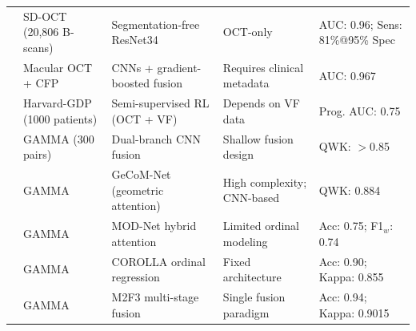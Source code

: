 \documentclass[preprint,12pt]{elsarticle}
\begin{document}
\begin{table}[!t]
{\begin{tabular}{p{} p{} p{} p{} p{}}
            \cite{thompson2020assessment}               &
            SD-OCT (20,806 B-scans)                     &
            Segmentation-free ResNet34                  &
            OCT-only                                    &
            AUC: 0.96; Sens: 81\%@95\% Spec               \\

            \cite{mehta2021automated}                   &
            Macular OCT + CFP                           &
            CNNs + gradient-boosted fusion              &
            Requires clinical metadata                  &
            AUC: 0.967                                    \\

            \cite{luo2023harvard}                       &
            Harvard-GDP (1000 patients)                 &
            Semi-supervised RL (OCT + VF)               &
            Depends on VF data                          &
            Prog. AUC: 0.75                               \\

            \cite{wu2023gamma}                          &
            GAMMA (300 pairs)                           &
            Dual-branch CNN fusion                      &
            Shallow fusion design                       &
            QWK: $>$0.85                                  \\

            \cite{wang2024geometric}                    &
            GAMMA                                       &
            GeCoM-Net (geometric attention)             &
            High complexity; CNN-based                  &
            QWK: 0.884                                    \\

            \cite{wang2025dual}                         &
            GAMMA                                       &
            MOD-Net hybrid attention                    &
            Limited ordinal modeling                    &
            Acc: 0.75; F1$_w$: 0.74                       \\

            \cite{cai2022corolla}                       &
            GAMMA                                       &
            COROLLA ordinal regression                  &
            Fixed architecture                          &
            Acc: 0.90; Kappa: 0.855                       \\

            \cite{zhao2025enhancing}                    &
            GAMMA                                       &
            M2F3 multi-stage fusion                     &
            Single fusion paradigm                      &
            Acc: 0.94; Kappa: 0.9015                      \\
            \hline
        \end{tabular}
    }
\end{table}
\end{document}
